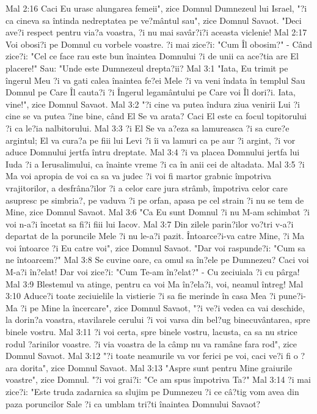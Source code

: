 Mal 2:16  Caci Eu urasc alungarea femeii", zice Domnul Dumnezeul lui Israel, "?i ca cineva sa întinda nedreptatea pe ve?mântul sau", zice Domnul Savaot. "Deci ave?i respect pentru via?a voastra, ?i nu mai savâr?i?i aceasta viclenie!
Mal 2:17  Voi obosi?i pe Domnul cu vorbele voastre. ?i mai zice?i: "Cum Îl obosim?" - Când zice?i: "Cel ce face rau este bun înaintea Domnului ?i de unii ca ace?tia are El placere!" Sau: "Unde este Dumnezeul drepta?ii?
Mal 3:1  "Iata, Eu trimit pe îngerul Meu ?i va gati calea înaintea fe?ei Mele ?i va veni îndata în templul Sau Domnul pe Care Îl cauta?i ?i Îngerul legamântului pe Care voi Îl dori?i. Iata, vine!", zice Domnul Savaot.
Mal 3:2  "?i cine va putea îndura ziua venirii Lui ?i cine se va putea ?ine bine, când El Se va arata? Caci El este ca focul topitorului ?i ca le?ia nalbitorului.
Mal 3:3  ?i El Se va a?eza sa lamureasca ?i sa cure?e argintul; El va cura?a pe fiii lui Levi ?i îi va lamuri ca pe aur ?i argint, ?i vor aduce Domnului jertfa întru dreptate.
Mal 3:4  ?i va placea Domnului jertfa lui Iuda ?i a Ierusalimului, ca înainte vreme ?i ca în anii cei de altadata.
Mal 3:5  ?i Ma voi apropia de voi ca sa va judec ?i voi fi martor grabnic împotriva vrajitorilor, a desfrâna?ilor ?i a celor care jura strâmb, împotriva celor care asupresc pe simbria?, pe vaduva ?i pe orfan, apasa pe cel strain ?i nu se tem de Mine, zice Domnul Savaot.
Mal 3:6  "Ca Eu sunt Domnul ?i nu M-am schimbat ?i voi n-a?i încetat sa fi?i fiii lui Iacov.
Mal 3:7  Din zilele parin?ilor vo?tri v-a?i departat de la poruncile Mele ?i nu le-a?i pazit. Întoarce?i-va catre Mine, ?i Ma voi întoarce ?i Eu catre voi", zice Domnul Savaot. "Dar voi raspunde?i: "Cum sa ne întoarcem?"
Mal 3:8  Se cuvine oare, ca omul sa în?ele pe Dumnezeu? Caci voi M-a?i în?elat! Dar voi zice?i: "Cum Te-am în?elat?" - Cu zeciuiala ?i cu pârga!
Mal 3:9  Blestemul va atinge, pentru ca voi Ma în?ela?i, voi, neamul întreg!
Mal 3:10  Aduce?i toate zeciuielile la vistierie ?i sa fie merinde în casa Mea ?i pune?i-Ma ?i pe Mine la încercare", zice Domnul Savaot, "?i ve?i vedea ca vai deschide, la dorin?a voastra, stavilarele cerului ?i voi varsa din bel?ug binecuvântarea, spre binele vostru.
Mal 3:11  ?i voi certa, spre binele vostru, lacusta, ca sa nu strice rodul ?arinilor voastre. ?i via voastra de la câmp nu va ramâne fara rod", zice Domnul Savaot.
Mal 3:12  "?i toate neamurile va vor ferici pe voi, caci ve?i fi o ?ara dorita", zice Domnul Savaot.
Mal 3:13  "Aspre sunt pentru Mine graiurile voastre", zice Domnul. "?i voi grai?i: "Ce am spus împotriva Ta?"
Mal 3:14  ?i mai zice?i: "Este truda zadarnica sa slujim pe Dumnezeu ?i ce câ?tig vom avea din paza poruncilor Sale ?i ca umblam tri?ti înaintea Domnului Savaot?
